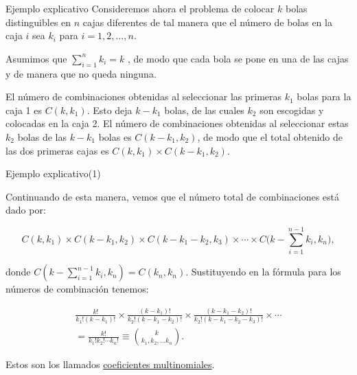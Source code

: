 \documentclass[10pt]{beamer}
\begin{document}
\begin{frame}{Ejemplo explicativo}
Consideremos ahora el problema de colocar $k$ bolas distinguibles en $n$ cajas diferentes de tal manera que el n\'umero de bolas en la caja $i$ sea $k_i$ para $i = 1,2, \dots, n$.

\vspace{0.2cm}

Asumimos que $\displaystyle \sum_{i =1}^n k_i = k$ , de modo que cada bola se pone en una de las cajas y de manera que no queda ninguna.


\vspace{0.2cm}

El n\'umero de combinaciones obtenidas al seleccionar las primeras $k_1$ bolas para la caja 1 es $C(k, k_1)$. Esto deja  $k -k_1$ bolas, de las cuales $k_2$ son escogidas y colocadas en la caja 2. El n\'umero de combinaciones obtenidas al seleccionar estas $k_2$ bolas  de las  $k - k_1$ bolas es $C(k- k_1, k_2)$, de modo que el total obtenido de las  dos primeras cajas es $C(k, k_1)\times C(k - k_1, k_2)$.

\end{frame}
\begin{frame}{Ejemplo explicativo(1)}
\small{Continuando de esta manera, vemos que el n\'umero total de combinaciones est\'a dado por:

\[
C(k, k_1)\times C(k -k_1, k_2) \times C(k -k_1 - k_2, k_3)\times \cdots \times C\Biggl( k - \sum_{i =1}^{n -1}k_i, k_n\Biggr),
\]



donde $ C( k - \sum_{i =1}^{n -1}k_i, k_n) = C(k_n, k_n)$. Sustituyendo en la f\'ormula para los n\'umeros de combinaci\'on tenemos:

\begin{align*}
\frac{k!}{k_1!( k - k_1)!} \times \frac{(k -k_1)!}{k_2!( k - k_1 -k_2)!} \times  \frac{(k -k_1 -k_2)!}{k_2!( k - k_1 -k_2 - k_3)!}\times \cdots \\
=\frac{k!}{k_1!k_2!\cdots k_n!}\equiv \binom{k}{k_1, k_2,\dots k_n}.
\end{align*}

\vspace{0.2cm}

Estos son los llamados \underline{coeficientes multinomiales}.
}
\end{frame}
\end{document}
